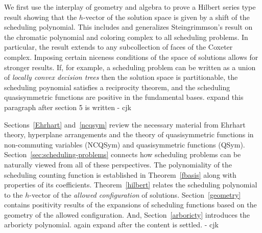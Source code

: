 \documentclass[12pt,reqno]{amsart}
\numberwithin{definition}{section}
\theoremstyle{definition}
\newcommand{\comment}[1]{\textsf{\footnotesize #1}}
\begin{document}
We first use the interplay of geometry and algebra to prove a Hilbert
series type result showing that the $h$-vector of the solution space
is given by a shift of the scheduling polynomial.  This includes and
generalizes Steingrimmson's result on the chromatic polynomial and
coloring complex to all scheduling problems.  In particular, the
result extends to any subcollection of faces of the Coxeter complex.
Imposing certain niceness conditions of the space of solutions allows
for stronger results.  If, for example,  a scheduling problem can be written as a
union of \emph{locally convex decision trees}  then the
solution space is partitionable, the scheduling poynomial satisfies a
reciprocity theorem, and the scheduling quasisymmetric functions are
positive in the fundamental bases. \comment{expand this paragraph after section 5 is written - cjk}


Sections~\ref{Ehrhart} and~\ref{ncqsym} review the necessary material
from Ehrhart theory, hyperplane arrangements and the theory of
quasisymmetric functions in non-commuting variables (NCQSym) and
quasisymmetric functions (QSym).  Section~\ref{sec:scheduling-problems} connects how
scheduling problems can be naturally viewed from all of these
perspectives.  The polynomiality of the scheduling counting function
is established in Theorem~\ref{fbasis} along with properties of its
coefficients.  Theorem~\ref{hilbert} relates the scheduling polynomial
to the $h$-vector of the \emph{allowed configuration} of solutions.
Section~\ref{geometry} contains positivity results of the expansions
of scheduling functions based on the geometry of the allowed
configuration.  And, Section~\ref{arboricty} introduces  the arboricty polynomial.
\comment{again expand after the content is settled. - cjk}



\end{document}
